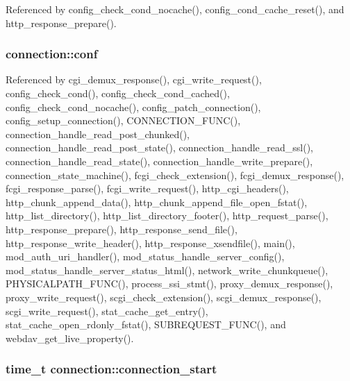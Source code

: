 Referenced by config\-\_\-check\-\_\-cond\-\_\-nocache(), config\-\_\-cond\-\_\-cache\-\_\-reset(), and http\-\_\-response\-\_\-prepare().

\hypertarget{structconnection_a64fd7626accd6bfd28525e9d17adf612}{
\subsubsection[{conf}]{ connection\-::conf}}\label{structconnection_a64fd7626accd6bfd28525e9d17adf612}


Referenced by cgi\-\_\-demux\-\_\-response(), cgi\-\_\-write\-\_\-request(), config\-\_\-check\-\_\-cond(), config\-\_\-check\-\_\-cond\-\_\-cached(), config\-\_\-check\-\_\-cond\-\_\-nocache(), config\-\_\-patch\-\_\-connection(), config\-\_\-setup\-\_\-connection(), C\-O\-N\-N\-E\-C\-T\-I\-O\-N\-\_\-\-F\-U\-N\-C(), connection\-\_\-handle\-\_\-read\-\_\-post\-\_\-chunked(), connection\-\_\-handle\-\_\-read\-\_\-post\-\_\-state(), connection\-\_\-handle\-\_\-read\-\_\-ssl(), connection\-\_\-handle\-\_\-read\-\_\-state(), connection\-\_\-handle\-\_\-write\-\_\-prepare(), connection\-\_\-state\-\_\-machine(), fcgi\-\_\-check\-\_\-extension(), fcgi\-\_\-demux\-\_\-response(), fcgi\-\_\-response\-\_\-parse(), fcgi\-\_\-write\-\_\-request(), http\-\_\-cgi\-\_\-headers(), http\-\_\-chunk\-\_\-append\-\_\-data(), http\-\_\-chunk\-\_\-append\-\_\-file\-\_\-open\-\_\-fstat(), http\-\_\-list\-\_\-directory(), http\-\_\-list\-\_\-directory\-\_\-footer(), http\-\_\-request\-\_\-parse(), http\-\_\-response\-\_\-prepare(), http\-\_\-response\-\_\-send\-\_\-file(), http\-\_\-response\-\_\-write\-\_\-header(), http\-\_\-response\-\_\-xsendfile(), main(), mod\-\_\-auth\-\_\-uri\-\_\-handler(), mod\-\_\-status\-\_\-handle\-\_\-server\-\_\-config(), mod\-\_\-status\-\_\-handle\-\_\-server\-\_\-status\-\_\-html(), network\-\_\-write\-\_\-chunkqueue(), P\-H\-Y\-S\-I\-C\-A\-L\-P\-A\-T\-H\-\_\-\-F\-U\-N\-C(), process\-\_\-ssi\-\_\-stmt(), proxy\-\_\-demux\-\_\-response(), proxy\-\_\-write\-\_\-request(), scgi\-\_\-check\-\_\-extension(), scgi\-\_\-demux\-\_\-response(), scgi\-\_\-write\-\_\-request(), stat\-\_\-cache\-\_\-get\-\_\-entry(), stat\-\_\-cache\-\_\-open\-\_\-rdonly\-\_\-fstat(), S\-U\-B\-R\-E\-Q\-U\-E\-S\-T\-\_\-\-F\-U\-N\-C(), and webdav\-\_\-get\-\_\-live\-\_\-property().

\hypertarget{structconnection_afbe997df45b9c7c51e7db09b52830642}{
\subsubsection[{connection\-\_\-start}]{\setlength{\rightskip}{0pt plus 5cm}time\-\_\-t connection\-::connection\-\_\-start}}\label{structconnection_afbe997df45b9c7c51e7db09b52830642}


